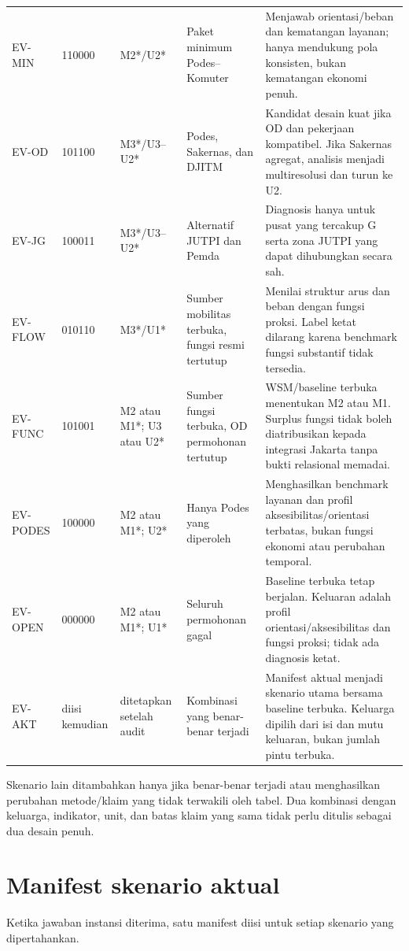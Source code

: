 \documentclass[10pt]{article}
\begin{document}
\begin{longtable}{@{}P{0.09\textwidth}P{0.11\textwidth}P{0.11\textwidth}P{0.21\textwidth}P{0.31\textwidth}@{}}
EV-MIN & 110000 & M2*/U2* & Paket minimum Podes--Komuter & Menjawab orientasi/beban dan kematangan layanan; hanya mendukung pola konsisten, bukan kematangan ekonomi penuh. \\
EV-OD & 101100 & M3*/U3--U2* & Podes, Sakernas, dan DJITM & Kandidat desain kuat jika OD dan pekerjaan kompatibel. Jika Sakernas agregat, analisis menjadi multiresolusi dan turun ke U2. \\
EV-JG & 100011 & M3*/U3--U2* & Alternatif JUTPI dan Pemda & Diagnosis hanya untuk pusat yang tercakup G serta zona JUTPI yang dapat dihubungkan secara sah. \\
EV-FLOW & 010110 & M3*/U1* & Sumber mobilitas terbuka, fungsi resmi tertutup & Menilai struktur arus dan beban dengan fungsi proksi. Label ketat dilarang karena benchmark fungsi substantif tidak tersedia. \\
EV-FUNC & 101001 & M2 atau M1*; U3 atau U2* & Sumber fungsi terbuka, OD permohonan tertutup & WSM/baseline terbuka menentukan M2 atau M1. Surplus fungsi tidak boleh diatribusikan kepada integrasi Jakarta tanpa bukti relasional memadai. \\
EV-PODES & 100000 & M2 atau M1*; U2* & Hanya Podes yang diperoleh & Menghasilkan benchmark layanan dan profil aksesibilitas/orientasi terbatas, bukan fungsi ekonomi atau perubahan temporal. \\
EV-OPEN & 000000 & M2 atau M1*; U1* & Seluruh permohonan gagal & Baseline terbuka tetap berjalan. Keluaran adalah profil orientasi/aksesibilitas dan fungsi proksi; tidak ada diagnosis ketat. \\
EV-AKT & diisi kemudian & ditetapkan setelah audit & Kombinasi yang benar-benar terjadi & Manifest aktual menjadi skenario utama bersama baseline terbuka. Keluarga dipilih dari isi dan mutu keluaran, bukan jumlah pintu terbuka. \\
\bottomrule
\end{longtable}

Skenario lain ditambahkan hanya jika benar-benar terjadi atau menghasilkan perubahan metode/klaim yang tidak terwakili oleh tabel. Dua kombinasi dengan keluarga, indikator, unit, dan batas klaim yang sama tidak perlu ditulis sebagai dua desain penuh.

\section{Manifest skenario aktual}

Ketika jawaban instansi diterima, satu manifest diisi untuk setiap skenario yang dipertahankan.
\end{document}

